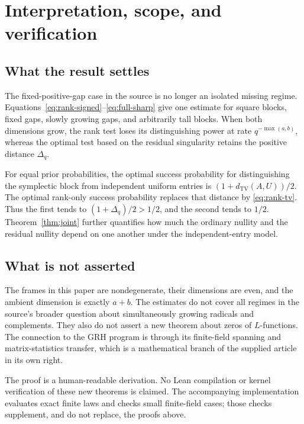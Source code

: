 \documentclass[11pt]{article}
\theoremstyle{definition}
\theoremstyle{remark}
\newcommand{\TV}{d_{\mathrm{TV}}}
\begin{document}
\section{Interpretation, scope, and verification}\label{sec:scope}

\subsection{What the result settles}

The fixed-positive-gap case in the source is no longer an isolated missing regime. Equations~\eqref{eq:rank-signed}--\eqref{eq:full-sharp} give one estimate for square blocks, fixed gaps, slowly growing gaps, and arbitrarily tall blocks. When both dimensions grow, the rank test loses its distinguishing power at rate $q^{-\max(a,b)}$, whereas the optimal test based on the residual singularity retains the positive distance $\Delta_q$.

For equal prior probabilities, the optimal success probability for distinguishing the symplectic block from independent uniform entries is $(1+\TV(A,U))/2$. The optimal rank-only success probability replaces that distance by \eqref{eq:rank-tv}. Thus the first tends to $(1+\Delta_q)/2>1/2$, and the second tends to $1/2$. Theorem~\ref{thm:joint} further quantifies how much the ordinary nullity and the residual nullity depend on one another under the independent-entry model.

\subsection{What is not asserted}

The frames in this paper are nondegenerate, their dimensions are even, and the ambient dimension is exactly $a+b$. The estimates do not cover all regimes in the source's broader question about simultaneously growing radicals and complements. They also do not assert a new theorem about zeros of $L$-functions. The connection to the GRH program is through its finite-field spanning and matrix-statistics transfer, which is a mathematical branch of the supplied article in its own right.

The proof is a human-readable derivation. No Lean compilation or kernel verification of these new theorems is claimed. The accompanying implementation evaluates exact finite laws and checks small finite-field cases; those checks supplement, and do not replace, the proofs above.


\end{document}
